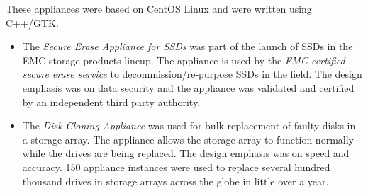 \documentclass[10pt,a4paper,sans]{moderncv}
\begin{document}
                       {These appliances were based on CentOS Linux and were written using C++/GTK.
                     \begin{itemize}
                         \item The {\em Secure Erase Appliance for SSDs} was
                             part of the launch of SSDs in the EMC storage products lineup.
                             The appliance is used by the {\em EMC certified secure erase service} to
                             decommission/re-purpose SSDs in the field. The design emphasis was on
                             data security and the appliance was validated and certified by
                             an independent third party authority.
                         \item The {\em Disk Cloning Appliance} was used for bulk
                             replacement of faulty disks in a storage array. The appliance allows the
                             storage array to function normally while the drives are being replaced.
                             The design emphasis was on speed and accuracy. 150 appliance instances
                             were used to replace several hundred thousand
                             drives in storage arrays across the globe in little over a year.
                 \end{itemize}}
\end{document}
